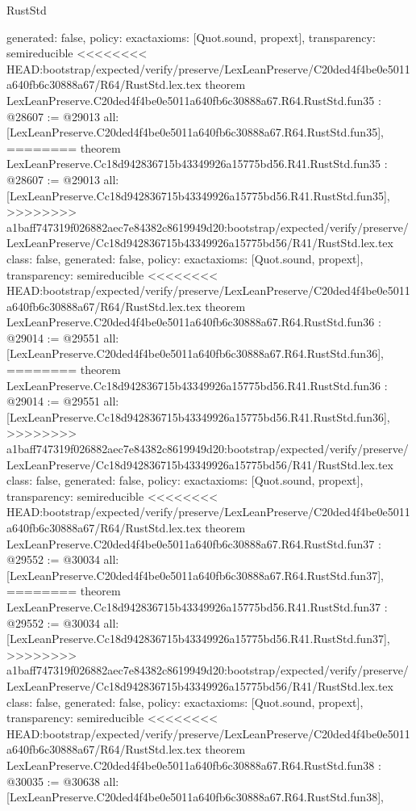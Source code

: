 \begin{lexlean}{RustStd}
\begin{coremodule}
{\begin{coremodule}
{{{{{{{{{{{{{{{{{{{{{{{{{{{{{{{{{{{{{{  generated: false,
  policy: exact{axioms: [Quot.sound, propext]},
  transparency: semireducible
}
<<<<<<<< HEAD:bootstrap/expected/verify/preserve/LexLeanPreserve/C20ded4f4be0e5011a640fb6c30888a67/R64/RustStd.lex.tex
theorem LexLeanPreserve.C20ded4f4be0e5011a640fb6c30888a67.R64.RustStd.fun35 : @28607 := @29013 {
  all: [LexLeanPreserve.C20ded4f4be0e5011a640fb6c30888a67.R64.RustStd.fun35],
========
theorem LexLeanPreserve.Cc18d942836715b43349926a15775bd56.R41.RustStd.fun35 : @28607 := @29013 {
  all: [LexLeanPreserve.Cc18d942836715b43349926a15775bd56.R41.RustStd.fun35],
>>>>>>>> a1baff747319f026882aec7e84382c8619949d20:bootstrap/expected/verify/preserve/LexLeanPreserve/Cc18d942836715b43349926a15775bd56/R41/RustStd.lex.tex
  class: false,
  generated: false,
  policy: exact{axioms: [Quot.sound, propext]},
  transparency: semireducible
}
<<<<<<<< HEAD:bootstrap/expected/verify/preserve/LexLeanPreserve/C20ded4f4be0e5011a640fb6c30888a67/R64/RustStd.lex.tex
theorem LexLeanPreserve.C20ded4f4be0e5011a640fb6c30888a67.R64.RustStd.fun36 : @29014 := @29551 {
  all: [LexLeanPreserve.C20ded4f4be0e5011a640fb6c30888a67.R64.RustStd.fun36],
========
theorem LexLeanPreserve.Cc18d942836715b43349926a15775bd56.R41.RustStd.fun36 : @29014 := @29551 {
  all: [LexLeanPreserve.Cc18d942836715b43349926a15775bd56.R41.RustStd.fun36],
>>>>>>>> a1baff747319f026882aec7e84382c8619949d20:bootstrap/expected/verify/preserve/LexLeanPreserve/Cc18d942836715b43349926a15775bd56/R41/RustStd.lex.tex
  class: false,
  generated: false,
  policy: exact{axioms: [Quot.sound, propext]},
  transparency: semireducible
}
<<<<<<<< HEAD:bootstrap/expected/verify/preserve/LexLeanPreserve/C20ded4f4be0e5011a640fb6c30888a67/R64/RustStd.lex.tex
theorem LexLeanPreserve.C20ded4f4be0e5011a640fb6c30888a67.R64.RustStd.fun37 : @29552 := @30034 {
  all: [LexLeanPreserve.C20ded4f4be0e5011a640fb6c30888a67.R64.RustStd.fun37],
========
theorem LexLeanPreserve.Cc18d942836715b43349926a15775bd56.R41.RustStd.fun37 : @29552 := @30034 {
  all: [LexLeanPreserve.Cc18d942836715b43349926a15775bd56.R41.RustStd.fun37],
>>>>>>>> a1baff747319f026882aec7e84382c8619949d20:bootstrap/expected/verify/preserve/LexLeanPreserve/Cc18d942836715b43349926a15775bd56/R41/RustStd.lex.tex
  class: false,
  generated: false,
  policy: exact{axioms: [Quot.sound, propext]},
  transparency: semireducible
}
<<<<<<<< HEAD:bootstrap/expected/verify/preserve/LexLeanPreserve/C20ded4f4be0e5011a640fb6c30888a67/R64/RustStd.lex.tex
theorem LexLeanPreserve.C20ded4f4be0e5011a640fb6c30888a67.R64.RustStd.fun38 : @30035 := @30638 {
  all: [LexLeanPreserve.C20ded4f4be0e5011a640fb6c30888a67.R64.RustStd.fun38],
}}}}}}}}}}}}}}}}}}}}}}}}}}}}}}}}}}}}}}}}}
\end{coremodule}}
\end{coremodule}
\end{lexlean}
